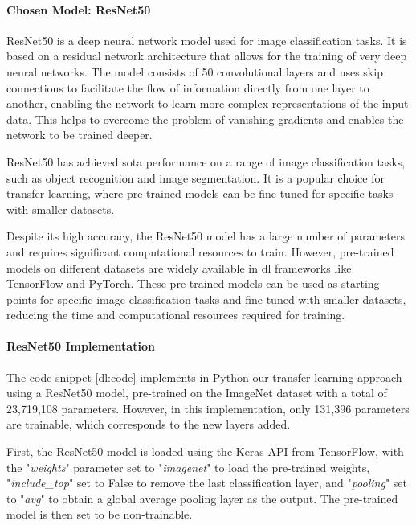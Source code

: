 \paragraph{Chosen Model: ResNet50}

ResNet50 is a deep neural network model used for image classification tasks. It is based on a residual network architecture that allows for the training of very deep neural networks. The model consists of 50 convolutional layers and uses skip connections to facilitate the flow of information directly from one layer to another, enabling the network to learn more complex representations of the input data. This helps to overcome the problem of vanishing gradients and enables the network to be trained deeper.

ResNet50 has achieved \ac{sota} performance on a range of image classification tasks, such as object recognition and image segmentation. It is a popular choice for transfer learning, where pre-trained models can be fine-tuned for specific tasks with smaller datasets.

Despite its high accuracy, the ResNet50 model has a large number of parameters and requires significant computational resources to train. However, pre-trained models on different datasets are widely available in \ac{dl} frameworks like TensorFlow and PyTorch. These pre-trained models can be used as starting points for specific image classification tasks and fine-tuned with smaller datasets, reducing the time and computational resources required for training.

\paragraph{ResNet50 Implementation}

The code snippet \ref{dl:code} implements in Python our transfer learning approach using a ResNet50 model, pre-trained on the ImageNet dataset with a total of 23,719,108 parameters. However, in this implementation, only 131,396 parameters are trainable, which corresponds to the new layers added.

First, the ResNet50 model is loaded using the Keras API from TensorFlow, with the "\textit{weights}" parameter set to "\textit{imagenet}" to load the pre-trained weights, "\textit{include\_top}" set to False to remove the last classification layer, and "\textit{pooling}" set to "\textit{avg}" to obtain a global average pooling layer as the output. The pre-trained model is then set to be non-trainable.

